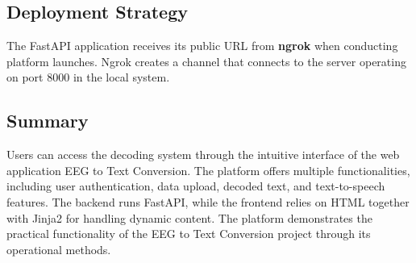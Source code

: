 \documentclass[journal]{IEEEtran}
\begin{document}
\subsection{Deployment Strategy}
The FastAPI application receives its public URL from \textbf{ngrok} when conducting platform launches. Ngrok creates a channel that connects to the server operating on port 8000 in the local system.

\subsection{Summary}
Users can access the decoding system through the intuitive interface of the web application EEG to Text Conversion. The platform offers multiple functionalities, including user authentication, data upload, decoded text, and text-to-speech features. The backend runs FastAPI, while the frontend relies on HTML together with Jinja2 for handling dynamic content. The platform demonstrates the practical functionality of the EEG to Text Conversion project through its operational methods.
\end{document}
